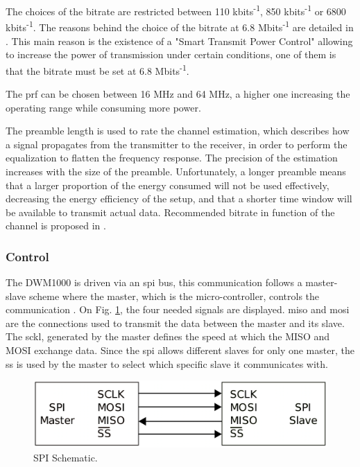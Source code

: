 The choices of the bitrate are restricted between 110 kbits\textsuperscript{-1}, 850 kbits\textsuperscript{-1} or 6800 kbits\textsuperscript{-1}. The reasons behind the choice of the bitrate at 6.8 Mbits\textsuperscript{-1} are detailed in \cite{hannotier2019indoor}. This main reason is the existence of a "Smart Transmit Power Control" allowing to increase the power of transmission under certain conditions, one of them is that the bitrate must be set at 6.8 Mbits\textsuperscript{-1}.
\vspace{2mm}

The \gls{prf} can be chosen between 16 MHz and 64 MHz, a higher one increasing the operating range while consuming more power.
\vspace{2mm}

The preamble length is used to rate the channel estimation, which describes how a signal propagates from the transmitter to the receiver, in order to perform the equalization to flatten the frequency response. The precision of the estimation increases with the size of the preamble. Unfortunately, a longer preamble means that a larger proportion of the energy consumed will not be used effectively, decreasing the energy efficiency of the setup, and that a shorter time window will be available to transmit actual data.  Recommended bitrate in function of the channel is proposed in \cite{usermanual}.
\vspace{2mm}

\subsubsection{Control}

The DWM1000 is driven via an \gls{spi} bus, this communication follows a master-slave scheme where the master, which is the micro-controller, controls the communication \cite{busspi}. On Fig. \ref{fig:spi_scheme}, the four needed signals are displayed. \gls{miso} and \gls{mosi} are the connections used to transmit the data between the master and its slave. The \gls{sckl}, generated by the master defines the speed at which the MISO and MOSI exchange data. Since the \gls{spi} allows different slaves for only one master, the \gls{ss} is used by the master to select which specific slave it communicates with. 

\begin{figure}[H]
	\centering
	\includegraphics[width=.6\linewidth]{Images/SPI_scheme.png}
	\caption{SPI Schematic.}
	\label{fig:spi_scheme}
\end{figure}

